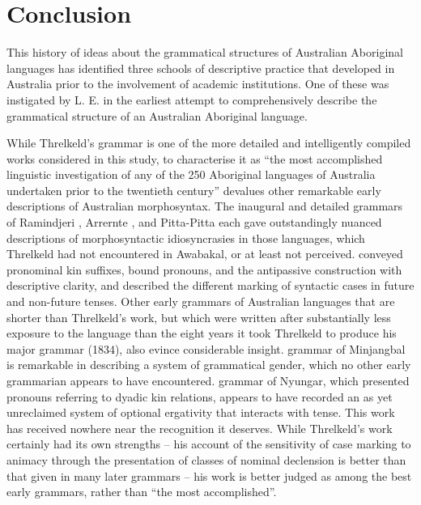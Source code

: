 \chapter{Conclusion}
\label{chap:key:11}

This history of ideas about the grammatical structures of Australian Aboriginal languages has identified three schools of descriptive practice that developed in Australia prior to the involvement of academic institutions. One of these was instigated by L. E. \citet{threlkeld_australian_1834} in the earliest attempt to comprehensively describe the grammatical structure of an Australian Aboriginal language.

While Threlkeld’s grammar is one of the more detailed and intelligently compiled works considered in this study, to characterise it as “the most accomplished linguistic investigation of any of the 250 Aboriginal languages of Australia undertaken prior to the twentieth century” \citep[253]{carey_lancelot_2004} devalues other remarkable early descriptions of Australian morphosyntax. The inaugural and detailed grammars of Ramindjeri \citep{meyer_vocabulary_1843}, Arrernte \citep{kempe_grammar_1891}, and Pitta-Pitta \citep{roth_ethnological_1897} each gave outstandingly nuanced descriptions of morphosyntactic idiosyncrasies in those languages, which Threlkeld had not encountered in Awabakal, or at least not perceived. \citet{meyer_vocabulary_1843} conveyed pronominal kin suffixes, bound pronouns, and the antipassive construction with descriptive clarity, and \citet{roth_ethnological_1897} described the different marking of syntactic cases in future and non-future tenses. Other early grammars of Australian languages that are shorter than Threlkeld’s work, but which were written after substantially less exposure to the language than the eight years it took Threlkeld to produce his major grammar (1834), also evince considerable insight.  grammar of Minjangbal is remarkable in describing a system of grammatical gender, which no other early grammarian appears to have encountered.  grammar of Nyungar, which presented pronouns referring to dyadic kin relations, appears to have recorded an as yet unreclaimed system of optional ergativity that interacts with tense. This work has received nowhere near the recognition it deserves. While Threlkeld’s work certainly had its own strengths – his  account of the sensitivity of case marking to animacy through the presentation of classes of nominal declension is better than that given in many later grammars – his work is better judged as among the best early grammars, rather than “the most accomplished''.

